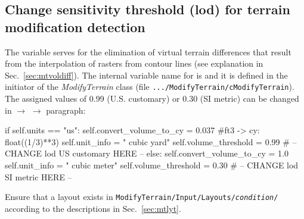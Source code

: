 \subsection{Change sensitivity threshold (lod) for terrain modification detection}
The  variable serves for the elimination of virtual terrain differences that result from the interpolation of rasters from contour lines (see explanation in Sec.~\ref{sec:mtvoldiff}). The internal variable name for  is  and it is defined in the initiator of the \textit{ModifyTerrain} class (file \texttt{.../ModifyTerrain/cModifyTerrain}). The assigned values of 0.99 (U.S. customary) or 0.30 (SI metric) can be changed in  $\rightarrow$  $\rightarrow$  paragraph:\\
\begin{python}
  if self.units == "us":
      self.convert_volume_to_cy = 0.037 #ft3 -> cy: float((1/3)**3)
      self.unit_info = " cubic yard"
      self.volume_threshold = 0.99 # -- CHANGE lod US customary HERE --
  else:
      self.convert_volume_to_cy = 1.0
      self.unit_info = " cubic meter"
      self.volume_threshold = 0.30 # -- CHANGE lod SI metric HERE --
\end{python}

Ensure that a layout exists in \texttt{ModifyTerrain/Input/Layouts/\textit{condition}/} according to the descriptions in Sec.~\ref{sec:mtlyt}.

